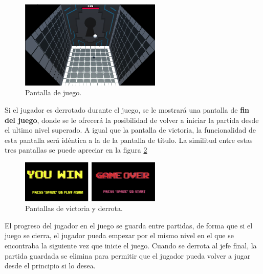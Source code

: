 \begin{figure}[h]
    \centering
    \label{juego}
    \includegraphics[width=0.6\textwidth]{images/estructura/escenas/juego}
    \caption{Pantalla de juego.}
\end{figure}

Si el jugador es derrotado durante el juego, se le mostrará una pantalla de \textbf{fin del juego}, donde se le ofrecerá la posibilidad de volver a iniciar la partida desde el ultimo nivel superado. A igual que la pantalla de victoria, la funcionalidad de esta pantalla será idéntica a la de la pantalla de título. La similitud entre estas tres pantallas se puede apreciar en la figura \ref{win_lose}

\begin{figure}[h]
    \centering
    \label{win_lose}
    \includegraphics[width=0.6\textwidth]{images/estructura/escenas/win_lose}
    \caption{Pantallas de victoria y derrota.}
\end{figure}

El progreso del jugador en el juego se guarda entre partidas, de forma que si el juego se cierra, el jugador pueda empezar por el mismo nivel en el que se encontraba la siguiente vez que inicie el juego. Cuando se derrota al jefe final, la partida guardada se elimina para permitir que el jugador pueda volver a jugar desde el principio si lo desea.

